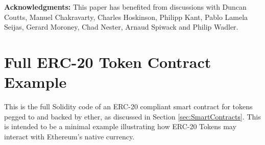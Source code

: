\documentclass{llncs}
\begin{document}
\bigskip

\noindent
\textbf{Acknowledgments:} This paper has benefited from discussions with Duncan Coutts, Manuel Chakravarty, Charles Hoskinson, Philipp Kant, Pablo Lamela Seijas, Gerard Moroney, Chad Nester, Arnaud Spiwack and Philip Wadler.


%
 
%


\appendix

\section{Full ERC-20 Token Contract Example}
\label{appendix:ERC20}

This is the full Solidity code of an ERC-20 compliant smart contract for tokens pegged to and 
backed by ether, as discussed in Section \ref{sec:SmartContracts}. This is intended to be a
minimal example illustrating how ERC-20 Tokens may interact with Ethereum's native currency.
\end{document}
